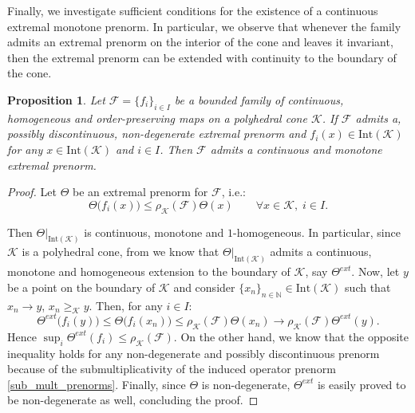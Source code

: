 \documentclass{article}
\newtheorem{proposition}[theorem]{Proposition}
\newcommand{\N}{\mathbb{N}}
\newcommand{\family}{\mathcal{F}}
\newcommand{\cradius}{\rho_{\cone}}
\newcommand{\cone}{\mathcal{K}}
\newcommand{\interior}{\mathrm{Int}}
\newcommand{\cgeq}{\geq_{\cone}}
\begin{document}
%
%
%
Finally, we investigate sufficient conditions for the existence of a continuous extremal monotone prenorm. In particular, we observe that whenever the family admits an extremal prenorm on the interior of the cone and leaves it invariant, then the extremal prenorm can be extended with continuity to the boundary of the cone.
%
%
\begin{proposition}\label{Prop_existence_of_continuous_extremal_prenorm}
    Let $\family=\{f_i\}_{i\in I}$ be a bounded family of continuous, homogeneous and order-preserving maps on a polyhedral cone $\cone$. If $\family$ admits a, possibly discontinuous, non-degenerate extremal prenorm and $f_i(x)\in \interior(\cone)$ for any $x\in\interior(\cone)$ and $i\in I$. Then $\family$ admits a continuous and monotone extremal prenorm. 
\end{proposition}
\begin{proof}
    Let $\Theta$ be an extremal prenorm for $\family$, i.e.:
\begin{equation}
    \Theta\big(f_i(x)\big)\leq \cradius(\family)\Theta(x)\qquad \forall x\in \cone,\;i\in I.
\end{equation}
 
 Then $\Theta|_{\interior(\cone)}$ is continuous, monotone and $1$-homogeneous. In particular, since $\cone$ is a polyhedral cone, from  we know that $\Theta|_{\interior(\cone)}$ admits a continuous, monotone and homogeneous extension to the boundary of $\cone$, say $\Theta^{ext}$.
    Now, let $y$ be a point on the boundary of $\cone$ and consider $\{x_n\}_{n\in \N}\in \interior (\cone)$ such that $x_n\rightarrow y$, $x_n\cgeq y$. 
    Then, for any $i\in I$:
    \begin{equation}
        \Theta^{ext}\big(f_i(y)\big)\leq  \Theta\big(f_i(x_n)\big)\leq \cradius(\family)\Theta(x_n)\rightarrow \cradius(\family)\Theta^{ext}(y).
    \end{equation}
   Hence $\sup_i \Theta^{ext}(f_i)\leq \cradius(\family)$. On the other hand, we know that the opposite inequality holds for any non-degenerate and possibly discontinuous prenorm because of the submultiplicativity of the induced operator prenorm \eqref{sub_mult_prenorms}. Finally, since $\Theta$ is non-degenerate, $\Theta^{ext}$ is easily proved to be non-degenerate as well, concluding the proof.
\end{proof}
\end{document}
